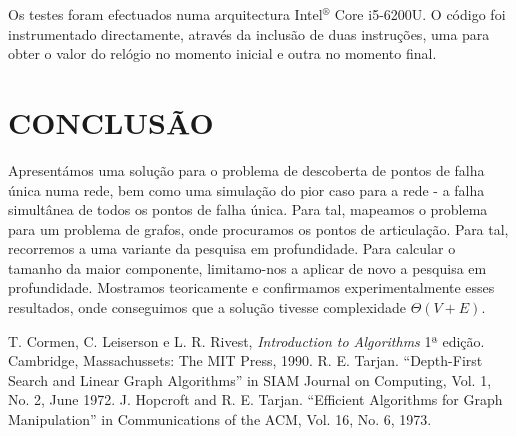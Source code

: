 \documentclass[a4paper, 12pt, conference]{ieeeconf}
\begin{document}
Os testes foram efectuados numa arquitectura Intel$^\circledR$ Core\texttrademark
i5-6200U. O código foi instrumentado directamente, através da inclusão de duas
instruções, uma para obter o valor do relógio no momento inicial e outra no
momento final.

\section{CONCLUSÃO}\label{conclusion}

Apresentámos uma solução para o problema de descoberta de pontos de falha única
numa rede, bem como uma simulação do pior caso para a rede - a falha simultânea de
todos os pontos de falha única. Para tal, mapeamos o problema para um problema
de grafos, onde procuramos os pontos de articulação. Para tal, recorremos a uma variante da
pesquisa em profundidade. Para calcular o tamanho da maior componente,
limitamo-nos a aplicar de novo a pesquisa em profundidade. Mostramos
teoricamente e confirmamos experimentalmente esses resultados, onde conseguimos
que a solução tivesse complexidade $\Theta(V + E)$.

\begin{thebibliography}{99}
   T. Cormen, C. Leiserson e L. R. Rivest, \textit{Introduction
    to Algorithms} 1ª edição. Cambridge, Massachussets: The MIT Press,
    1990.
   R. E. Tarjan. ``Depth-First Search and Linear Graph
    Algorithms'' in SIAM Journal on Computing, Vol. 1, No. 2, June 1972.
   J. Hopcroft and R. E. Tarjan. ``Efficient Algorithms for
    Graph Manipulation'' in Communications of the ACM, Vol. 16, No. 6, 1973.
\end{thebibliography}
\end{document}
